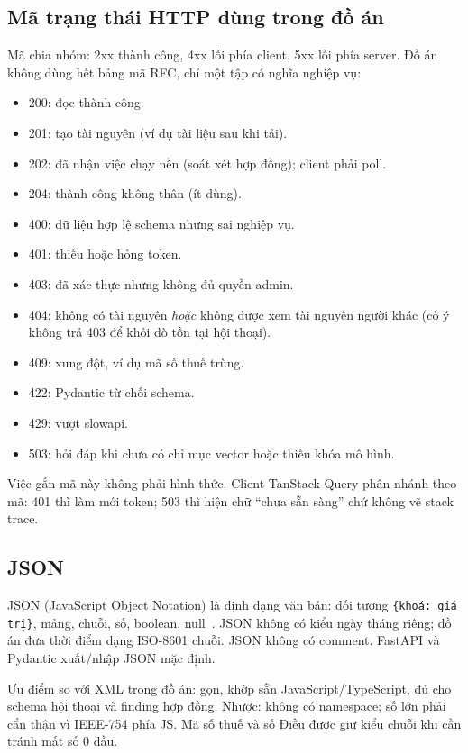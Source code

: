 \subsection{Mã trạng thái HTTP dùng trong đồ án}

Mã chia nhóm: 2xx thành công, 4xx lỗi phía client, 5xx lỗi phía server. Đồ án
không dùng hết bảng mã RFC, chỉ một tập có nghĩa nghiệp vụ:

\begin{itemize}
    \item 200: đọc thành công.
    \item 201: tạo tài nguyên (ví dụ tài liệu sau khi tải).
    \item 202: đã nhận việc chạy nền (soát xét hợp đồng); client phải poll.
    \item 204: thành công không thân (ít dùng).
    \item 400: dữ liệu hợp lệ schema nhưng sai nghiệp vụ.
    \item 401: thiếu hoặc hỏng token.
    \item 403: đã xác thực nhưng không đủ quyền admin.
    \item 404: không có tài nguyên \emph{hoặc} không được xem tài nguyên người
    khác (cố ý không trả 403 để khỏi dò tồn tại hội thoại).
    \item 409: xung đột, ví dụ mã số thuế trùng.
    \item 422: Pydantic từ chối schema.
    \item 429: vượt slowapi.
    \item 503: hỏi đáp khi chưa có chỉ mục vector hoặc thiếu khóa mô hình.
\end{itemize}

Việc gắn mã này không phải hình thức. Client TanStack Query phân nhánh theo mã:
401 thì làm mới token; 503 thì hiện chữ ``chưa sẵn sàng'' chứ không vẽ stack
trace.

\subsection{JSON}

JSON (JavaScript Object Notation) là định dạng văn bản: đối tượng
\texttt{\{khoá: giá trị\}}, mảng, chuỗi, số, boolean, null~\cite{rfc8259}. JSON
không có kiểu ngày tháng riêng; đồ án đưa thời điểm dạng ISO-8601 chuỗi. JSON
không có comment. FastAPI và Pydantic xuất/nhập JSON mặc định.

Ưu điểm so với XML trong đồ án: gọn, khớp sẵn JavaScript/TypeScript, đủ cho schema
hội thoại và finding hợp đồng. Nhược: không có namespace; số lớn phải cẩn thận vì
IEEE-754 phía JS. Mã số thuế và số Điều được giữ kiểu chuỗi khi cần tránh mất số 0
đầu.

